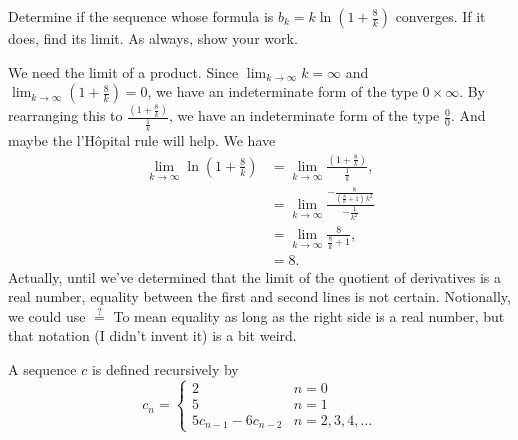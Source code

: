 \documentclass[12pt,fleqn,answers]{exam}
\begin{document}
\begin{questions}
  \newpage
  \question [2] Determine if the sequence whose formula is 
  $b_k = k \ln \left(1+\frac{8}{k} \right)$ converges. If it does, find its 
  limit. As always, show your work.
  \begin{solution}%
We need the limit of a product. Since $\displaystyle \lim_{k \to \infty} k = \infty$ and $\displaystyle \lim_{k \to \infty} \left(1+\frac{8}{k} \right) = 0$, we have an indeterminate form of the type $0 \times \infty$. By rearranging this to $\frac{\left(1+\frac{8}{k} \right) }{\frac{1}{k}}$,
we have an  indeterminate form of the type $\frac{0}{0}$. And maybe the l'Hôpital rule will help.  We have
\begin{align*}
  \lim_{ k  \to \infty} \ln \left(1+\frac{8}{k} \right) &=  \lim_{k \to \infty} \frac{\left(1+\frac{8}{k} \right) }{\frac{1}{k}}, \\
                                                                                          &= \lim_{k \to \infty} \frac{ -\frac{8}{\left( \frac{8}{k}+1\right) \, {{k}^{2}}}}{-\frac{1}{k^2}}\\
                                                                                          &=  \lim_{k \to \infty} \frac{8}{\frac{8}{k}+1}, \\
                                                                                          &= 8.
\end{align*}
  Actually, until we've determined that the limit of the quotient of derivatives is a real number, equality between the first and second lines is 
  not certain.  Notionally, we could use $\overset{?}{=}$ To mean equality as long as the right side is a real number, but that notation (I didn't invent it) is a bit weird.
  \end{solution}

  \newpage
  \question A sequence $c$ is defined recursively by
  \begin{equation*}
      c_n = \begin{cases} 2 & n=0 \\
                          5 & n=1 \\
                          5 c_{n-1}-6 c_{n-2} & n=2,3,4,\dots
      \end{cases}
    \end{equation*}
        
\end{questions}
\end{document}
